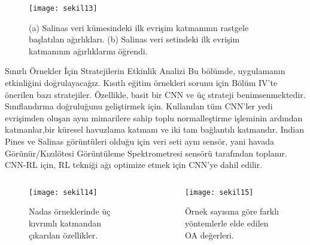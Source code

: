 \documentclass{beamer}
\begin{document}
\begin{frame}
\begin{figure}[]
  \centering
  \texttt{[image: sekil13]}
  \caption{(a) Salinas veri kümesindeki ilk evrişim katmanının rastgele başlatılan ağırlıkları. (b) Salinas veri setindeki ilk evrişim katmanının ağırlıklarını öğrendi.}
  \label{fig:sekil11}
\end{figure}
\end{frame}

\begin{frame}{Sınırlı Örnekler İçin Stratejilerin Etkinlik Analizi}
  Bu bölümde, uygulamanın etkinliğini doğrulayacağız. Kısıtlı eğitim örnekleri sorunu için Bölüm IV'te önerilen bazı stratejiler. Özellikle, basit bir CNN ve üç strateji benimsenmektedir. Sınıflandırma doğruluğunu geliştirmek için. Kullanılan tüm CNN’ler yedi evrişimden oluşan aynı mimarilere sahip toplu normalleştirme işleminin ardından katmanlar,bir küresel havuzlama katmanı ve iki tam bağlantılı katmandır. Indian Pines ve Salinas görüntüleri olduğu için veri seti aynı sensör, yani havada Görünür/Kızılötesi Görüntüleme Spektrometresi sensörü tarafından toplanır. CNN-RL için, RL tekniği ağı optimize etmek için CNN'ye dahil edilir.
\end{frame}

\begin{frame}

  \begin{columns}
    \begin{column}{0.4\textwidth}
      \begin{figure}[htbp]
        \texttt{[image: sekil14]}
        \caption{Nadas örneklerinde üç kıvrımlı katmandan çıkarılan özellikler.}
        \label{fig:sekil9}
      \end{figure}
    \end{column}

    \begin{column}{0.7\textwidth}
      \begin{figure}[htbp]
        \texttt{[image: sekil15]}
        \caption{Örnek sayısına göre farklı yöntemlerle elde edilen OA değerleri.}
        \label{fig:sekil10}
      \end{figure}
    \end{column}
  \end{columns}
\end{frame}
\end{document}
